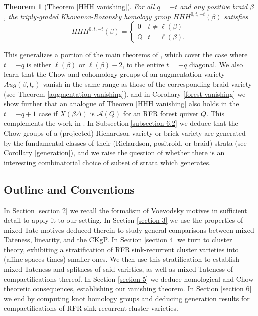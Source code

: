 \documentclass[11pt]{amsart}
\newtheorem{thm}{Theorem}[section]
\theoremstyle{definition}
\theoremstyle{remark}
\numberwithin{equation}{section}
\begin{document}
\begin{thm}[Theorem \ref{HHH vanishing}]
    For all $q = -t$ and any positive braid $\beta$, the triply-graded Khovanov-Rozansky homology group $HHH^{0, t, -t}(\beta)$ satisfies \begin{equation}
        HHH^{0, t, -t}(\beta) = \begin{cases}  0 & t \neq \ell(\beta) \\
    \mathbb{Q} & t = \ell(\beta) .
   \end{cases} \end{equation}
\end{thm}

This generalizes a portion of the main theorems of \cite{li2025last}, which cover the case where $t = -q$ is either $\ell(\beta)$ or $\ell(\beta) -2$, to the entire $t = -q$ diagonal. We also learn that the Chow and cohomology groups of an augmentation variety $Aug(\beta, \mathfrak{t}_c)$ vanish in the same range as those of the corresponding braid variety (see Theorem \ref{augmentation vanishing}), and in Corollary \ref{forest vanishing} we show further that an analogue of Theorem \ref{HHH vanishing} also holds in the $t = -q + 1$ case if $X(\beta \Delta)$ is $\mathcal{A}(Q)$ for an RFR forest quiver $Q$. This complements the work in \cite{schwartz2026homfly}. In Subsection \ref{subsection 6.2} we deduce that the Chow groups of a (projected) Richardson variety or brick variety are generated by the fundamental classes of their (Richardson, positroid, or braid) strata (see Corollary \ref{generation}), and we raise the question of whether there is an interesting combinatorial choice of subset of strata which generates.

\subsection{Outline and Conventions}
In Section \ref{section 2} we recall the formalism of Voevodsky motives in sufficient detail to apply it to our setting. In Section \ref{section 3} we use the properties of mixed Tate motives deduced therein to study general comparisons between mixed Tateness, linearity, and the CKgP. In Section \ref{section 4} we turn to cluster theory, exhibiting a stratification of RFR sink-recurrent cluster varieties into (affine spaces times) smaller ones. We then use this stratification to establish mixed Tateness and splitness of said varieties, as well as mixed Tateness of compactifications thereof. In Section \ref{section 5} we deduce homological and Chow theoretic consequences, establishing our vanishing theorem. In Section \ref{section 6} we end by computing knot homology groups and deducing generation results for compactifications of RFR sink-recurrent cluster varieties.\\
\end{document}
